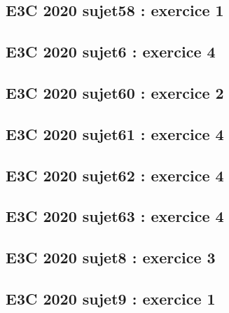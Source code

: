 \documentclass[lang=fr,edition=teacher,layout=sheet]{mxbook}
\begin{document}
\subsection*{E3C 2020 sujet58 : exercice 1}
\begingroup\endgroup
\par\bigskip
{}\subsection*{E3C 2020 sujet6 : exercice 4}
\begingroup\endgroup
\par\bigskip
{}\subsection*{E3C 2020 sujet60 : exercice 2}
\begingroup\endgroup
\par\bigskip
{}\subsection*{E3C 2020 sujet61 : exercice 4}
\begingroup\endgroup
\par\bigskip
{}\subsection*{E3C 2020 sujet62 : exercice 4}
\begingroup\endgroup
\par\bigskip
{}\subsection*{E3C 2020 sujet63 : exercice 4}
\begingroup\endgroup
\par\bigskip
{}\subsection*{E3C 2020 sujet8 : exercice 3}
\begingroup\endgroup
\par\bigskip
{}\subsection*{E3C 2020 sujet9 : exercice 1}
\end{document}
